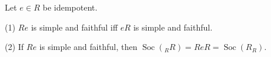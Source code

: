 Let $e \in R$ be idempotent.

(1) $Re$ is simple and faithful iff $eR$ is simple and faithful.

(2) If $Re$ is simple and faithful, then $\operatorname{Soc}({}_R R) = ReR = \operatorname{Soc}(R_R)$.
